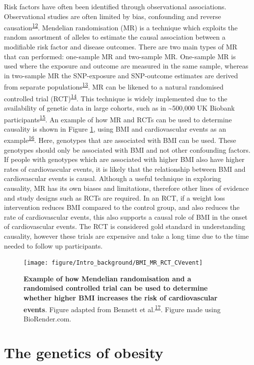 \documentclass[11pt,twoside]{bristolthesis}
\begin{document}
Risk factors have often been identified through observational associations. Observational studies are often limited by bias, confounding and reverse causation\textsuperscript{\protect\hyperlink{ref-Davies2018}{12}}. Mendelian randomisation (MR) is a technique which exploits the random assortment of alleles to estimate the causal association between a modifiable risk factor and disease outcomes. There are two main types of MR that can performed: one-sample MR and two-sample MR. One-sample MR is used where the exposure and outcome are measured in the same sample, whereas in two-sample MR the SNP-exposure and SNP-outcome estimates are derived from separate populations\textsuperscript{\protect\hyperlink{ref-Zheng2019a}{13}}. MR can be likened to a natural randomised controlled trial (RCT)\textsuperscript{\protect\hyperlink{ref-Gill2020}{14}}. This technique is widely implemented due to the availability of genetic data in large cohorts, such as in \textasciitilde500,000 UK Biobank participants\textsuperscript{\protect\hyperlink{ref-Bycroft2018}{15}}. An example of how MR and RCTs can be used to determine causality is shown in Figure \ref{fig:MR-CVevent}, using BMI and cardiovascular events as an example\textsuperscript{\protect\hyperlink{ref-Doney2009}{16}}. Here, genotypes that are associated with BMI can be used. These genotypes should only be associated with BMI and not other confounding factors. If people with genotypes which are associated with higher BMI also have higher rates of cardiovascular events, it is likely that the relationship between BMI and cardiovascular events is causal. Although a useful technique in exploring causality, MR has its own biases and limitations, therefore other lines of evidence and study designs such as RCTs are required. In an RCT, if a weight loss intervention reduces BMI compared to the control group, and also reduces the rate of cardiovascular events, this also supports a causal role of BMI in the onset of cardiovascular events. The RCT is considered gold standard in understanding causality, however these trials are expensive and take a long time due to the time needed to follow up participants.




\begin{figure}

{\centering \texttt{[image: figure/Intro\_background/BMI\_MR\_RCT\_CVevent]} 

}

\caption[Mendelian randomisation and randomised controlled trial example using body mass index and cardiovascular events]{\textbf{Example of how Mendelian randomisation and a randomised controlled trial can be used to determine whether higher BMI increases the risk of cardiovascular events}. Figure adapted from Bennett et al.\textsuperscript{\protect\hyperlink{ref-Bennett2017}{17}}. Figure made using BioRender.com.}\label{fig:MR-CVevent}
\end{figure}
\hypertarget{the-genetics-of-obesity}{%
\section{The genetics of obesity}\label{the-genetics-of-obesity}}
\end{document}
